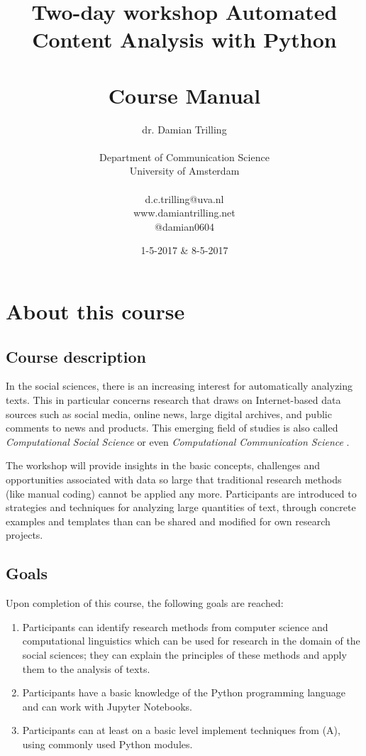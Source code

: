 \documentclass[a4paper,12pt]{report}
\title{Two-day workshop Automated Content Analysis with Python\\~\\Course Manual}
\author{dr. Damian Trilling\\~\\
Department of Communication Science
\\University of Amsterdam\\~\\d.c.trilling@uva.nl\\www.damiantrilling.net\\@damian0604\\}
\date{1-5-2017 \& 8-5-2017}
\begin{document}
\maketitle



\section*{About this course}

\subsection*{Course description}
 
In the social sciences, there is an increasing interest for automatically analyzing texts. This in particular concerns research that draws on Internet-based data sources such as social media, online news, large digital archives, and public comments to news and products.  This emerging field of studies is also called \emph{Computational Social Science} \citep{Lazer2009} or even \emph{Computational Communication Science} \citep{Shah2015}.

The workshop will provide insights in the basic concepts, challenges and opportunities associated with data so large that traditional research methods (like manual coding) cannot be applied any more. Participants are introduced to strategies and techniques for analyzing large quantities of text, through concrete examples and templates than can be shared and modified for own research projects. 


\subsection*{Goals}
Upon completion of this course, the following goals are reached:
\begin{enumerate}[A]

\item Participants can identify research methods from computer science and computational linguistics which can be used for research in the domain of the social sciences; they can explain the principles of these methods and apply them to the analysis of texts.

\item Participants have a basic knowledge of the Python programming language and can work with Jupyter Notebooks.

\item Participants can at least on a basic level implement techniques from (A), using commonly used Python modules.

\end{enumerate}
\end{document}
